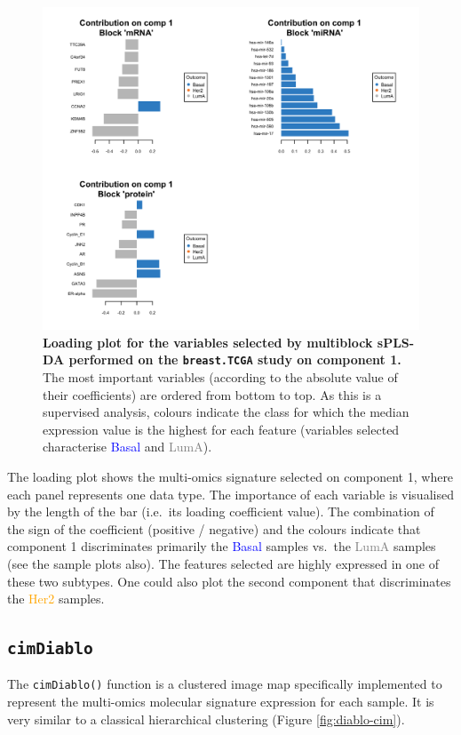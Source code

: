 \documentclass[]{book}
\begin{document}
\begin{figure}

{\centering \includegraphics[width=0.5\linewidth]{Figures/DIABLO/diablo-loading-1} 

}

\caption{\textbf{Loading plot for the variables selected by multiblock sPLS-DA performed on the \texttt{breast.TCGA} study on component 1.} The most important variables (according to the absolute value of their coefficients) are ordered from bottom to top. As this is a supervised analysis, colours indicate the class for which the median expression value is the highest for each feature (variables selected characterise \textcolor{blue}{Basal} and \textcolor{grey}{LumA}).}\label{fig:diablo-loading}
\end{figure}



The loading plot shows the multi-omics signature selected on component 1, where each panel represents one data type. The importance of each variable is visualised by the length of the bar (i.e.~its loading coefficient value). The combination of the sign of the coefficient (positive / negative) and the colours indicate that component 1 discriminates primarily the \textcolor{blue}{Basal} samples vs.~the \textcolor{grey}{LumA} samples (see the sample plots also). The features selected are highly expressed in one of these two subtypes. One could also plot the second component that discriminates the \textcolor{orange}{Her2} samples.

\hypertarget{cimdiablo}{%
\subsection{\texorpdfstring{\texttt{cimDiablo}}{cimDiablo}}\label{cimdiablo}}

The \texttt{cimDiablo()} function is a clustered image map specifically implemented to represent the multi-omics molecular signature expression for each sample. It is very similar to a classical hierarchical clustering (Figure \ref{fig:diablo-cim}).
\end{document}
